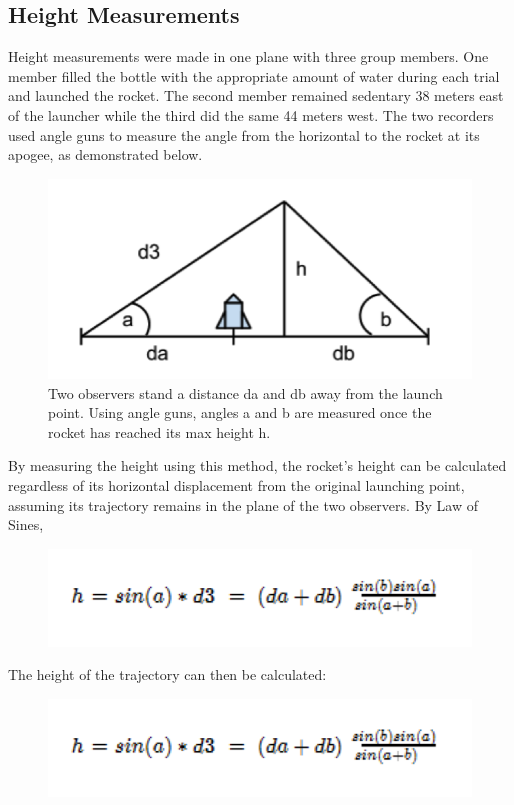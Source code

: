 \documentclass[12pt]{article}
\begin{document}
    \subsection{Height Measurements}
    Height measurements were made in one plane with three group members. One member filled the bottle with the appropriate amount of water during each trial and launched the rocket. The second member remained sedentary 38 meters east of the launcher while the third did the same 44 meters west. The two recorders used angle guns to measure the angle from the horizontal to the rocket at its apogee, as demonstrated below.
    
\begin{figure}[H]
\includegraphics{heightDiagram.png}
\centering
  \caption{Two observers stand a distance da and db away from the launch point. Using    	angle guns, angles a and b are measured once the rocket has reached its max height h.}
\end{figure}

By measuring the height using this method, the rocket’s height can be calculated regardless of its horizontal displacement from the original launching point, assuming its trajectory remains in the plane of the two observers. By Law of Sines,

\begin{figure}[H]
\includegraphics{trigEq2.png}
\centering
\end{figure}

The height of the trajectory can then be calculated:

\begin{figure}[H]
\includegraphics{trigEq2.png}
\centering
\end{figure}
\end{document}

